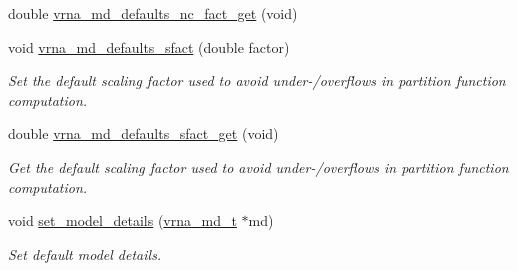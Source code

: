 \begin{DoxyCompactItemize}
\item 
double \hyperlink{group__model__details_ga7ac759eaa7159bf5f022745f5da59508}{vrna\+\_\+md\+\_\+defaults\+\_\+nc\+\_\+fact\+\_\+get} (void)
\item 
void \hyperlink{group__model__details_ga3f73d3029d3d0025d4cc311510cd95a3}{vrna\+\_\+md\+\_\+defaults\+\_\+sfact} (double factor)
\begin{DoxyCompactList}\small\item\em Set the default scaling factor used to avoid under-\//overflows in partition function computation. \end{DoxyCompactList}\item 
double \hyperlink{group__model__details_gab2df6aab954b63fd3592d18e90285dae}{vrna\+\_\+md\+\_\+defaults\+\_\+sfact\+\_\+get} (void)
\begin{DoxyCompactList}\small\item\em Get the default scaling factor used to avoid under-\//overflows in partition function computation. \end{DoxyCompactList}\item 
void \hyperlink{group__model__details_gabad896c3650d420f3f3ddefc69e2bceb}{set\+\_\+model\+\_\+details} (\hyperlink{group__model__details_ga1f8a10e12a0a1915f2a4eff0b28ea17c}{vrna\+\_\+md\+\_\+t} $\ast$md)
\begin{DoxyCompactList}\small\item\em Set default model details. \end{DoxyCompactList}\end{DoxyCompactItemize}
